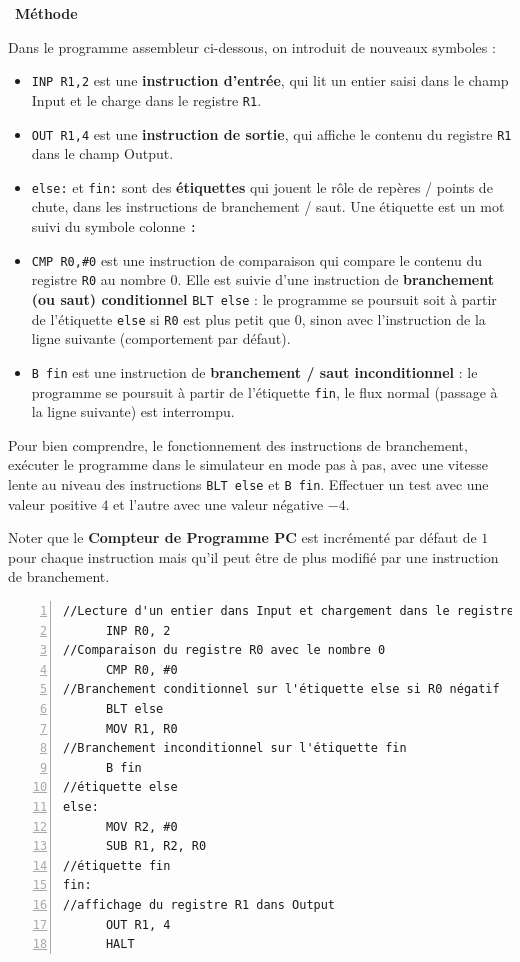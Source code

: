\documentclass[a4paper, french, 11pt]{article}  %
\newcounter{prog}
\newenvironment{methode}[1]
{\par \medskip    \noindent  
 \begin {bclogo}[arrondi =0.1,logo=\bcoutil, marge=4,noborder = true] {~\textbf{Méthode}   {\itshape #1} }  \par}
{
\end{bclogo}
 \par \bigskip }
\begin{document}
\begin{methode}{}

Dans le programme assembleur ci-dessous, on introduit de nouveaux symboles :

\begin{itemize}[label=]
	\item \texttt{INP R1,2} est une \textbf{instruction d'entrée}, qui lit un entier  saisi dans le champ Input et le charge dans le registre \texttt{R1}.
	\item \texttt{OUT R1,4} est une \textbf{instruction de sortie}, qui affiche le contenu du registre \texttt{R1} dans le champ Output.
	\item \texttt{else:} et \texttt{fin:} sont des \textbf{étiquettes} qui jouent le rôle de repères / points de chute,  dans les instructions de branchement / saut. Une étiquette est un mot suivi du symbole colonne \texttt{:}
	\item \texttt{CMP R0,\#0} est une instruction de comparaison qui compare le contenu du registre \texttt{R0} au nombre $0$.   Elle est suivie d'une instruction de \textbf{branchement (ou saut) conditionnel}   \texttt{BLT else} : le programme se poursuit soit à partir de l'étiquette \texttt{else} si \texttt{R0} est plus petit que $0$, sinon  avec l'instruction de la ligne suivante (comportement par défaut).
	\item  \texttt{B fin} est une instruction de \textbf{branchement / saut inconditionnel} : le programme se poursuit  à partir de l'étiquette \texttt{fin}, le flux normal (passage à la ligne suivante) est interrompu.
	

\end{itemize}


Pour bien comprendre, le fonctionnement des instructions de branchement, exécuter le programme dans le simulateur en mode pas à pas, avec une vitesse lente au niveau des instructions \texttt{BLT else} et \texttt{B fin}.  Effectuer un test avec une valeur positive $4$ et l'autre avec une valeur négative $-4$.

Noter que le \textbf{Compteur de Programme PC} est incrémenté par défaut  de $1$ pour chaque instruction mais qu'il peut être de plus modifié par une instruction de branchement.


\begin{lstlisting}[numbers=left, language={[x86masm]Assembler}]
//Lecture d'un entier dans Input et chargement dans le registre R0
      INP R0, 2
//Comparaison du registre R0 avec le nombre 0
      CMP R0, #0
//Branchement conditionnel sur l'étiquette else si R0 négatif
      BLT else
      MOV R1, R0
//Branchement inconditionnel sur l'étiquette fin
      B fin
//étiquette else
else:
      MOV R2, #0
      SUB R1, R2, R0
//étiquette fin
fin:
//affichage du registre R1 dans Output
      OUT R1, 4
      HALT 
\end{lstlisting}



\end{methode}
\end{document}
